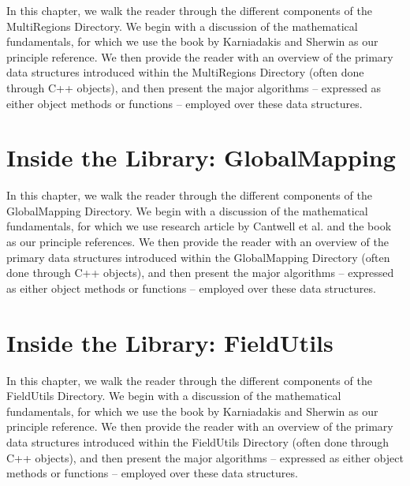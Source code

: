 In this chapter, we walk the reader through the different components
of the MultiRegions Directory.  We begin with a discussion of the
mathematical fundamentals, for which we use the book by Karniadakis
and Sherwin \cite{KaSh05} as our principle reference.  We then provide
the reader with an overview of the primary data structures introduced
within the MultiRegions Directory (often done through C++ objects),
and then present the major algorithms -- expressed as either object
methods or functions -- employed over these data structures.


%

%

%




\chapter{Inside the Library: GlobalMapping}
\label{chapter:globalmapping} 

In this chapter, we walk the reader through the different components
of the GlobalMapping Directory.  We begin with a discussion of the
mathematical fundamentals, for which we use research article by
Cantwell et al. \cite{CantwellYKPS14} and the book \cite{Ar89} as our
principle references.  We then provide the reader with an overview of
the primary data structures introduced within the GlobalMapping
Directory (often done through C++ objects), and then present the major
algorithms -- expressed as either object methods or functions --
employed over these data structures.


%

%



\chapter{Inside the Library: FieldUtils}

In this chapter, we walk the reader through the different components of the FieldUtils Directory.
We begin with a discussion of the mathematical fundamentals, for which we use the book
by Karniadakis and Sherwin \cite{KaSh05} as our principle reference.  We then provide
the reader with an overview of the primary data structures introduced within the
FieldUtils Directory (often done through C++ objects), and then present the major 
algorithms -- expressed as either object methods or functions -- employed over these data structures.  

